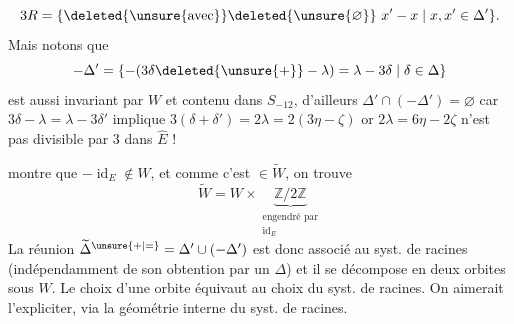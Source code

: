 \[
3R=\{\deleted{\unsure{\text{avec}}}\deleted{\unsure{\varnothing}}\ x'-x\mid x,x'\in\Delta'\}.
\]
Mais  notons que
\[
-\Delta'=\{-(3\delta\deleted{\unsure{+}}-\lambda)=\lambda-3\delta\mid\delta\in\Delta\}
\]
est aussi invariant par $W$ et contenu dans $S_{-12}$, d'ailleurs  $\Delta'\cap(-\Delta')=\varnothing$ car $3\delta-\lambda=\lambda-3\delta'$ implique $3(\delta+\delta')=2\lambda=2(3\eta-\zeta)$ or $2\lambda=6\eta-2\zeta$ n'est pas divisible par $3$ dans $\widehat E$ !

  montre que $-\operatorname{id}_E\notin W$, et comme c'est $\in\widetilde W$, on trouve
\[
\widetilde W=W\times\underbrace{\mathbb Z/2\mathbb Z}_{\substack{\text{engendré par}\\\operatorname{id}_E}}
\]
\deleted{\unsure{$\Delta$}} La réunion $\widetilde\Delta^{\unsure{+|=}}=\Delta'\cup(-\Delta')$ est donc   associé au syst. de racines (indépendamment de son obtention par un $\Delta$) et il se décompose en deux orbites sous $W$. Le choix d'une orbite équivaut au choix du syst. de racines. On aimerait l'expliciter,  via la géométrie interne du syst. de racines.
